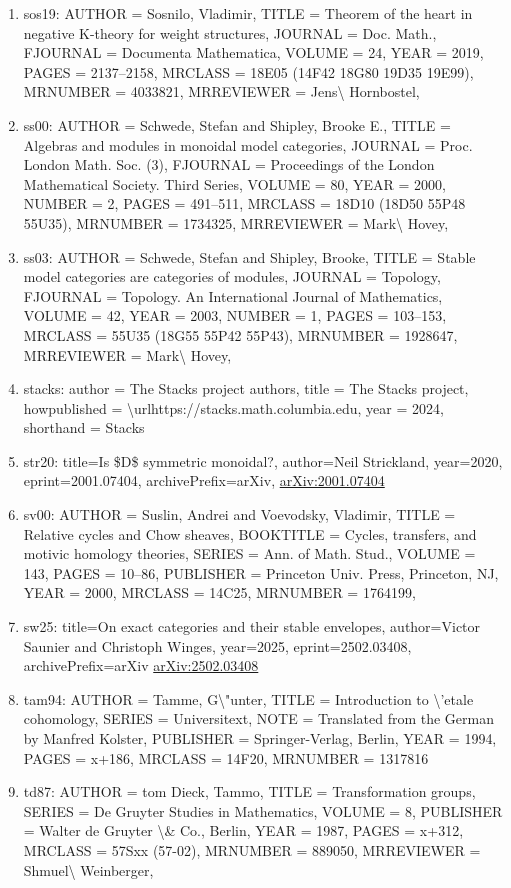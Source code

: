 \documentclass[11pt]{article}
\begin{document}
\begin{enumerate}[leftmargin=*]
  \item sos19: AUTHOR = Sosnilo, Vladimir, TITLE = Theorem of the heart in negative K-theory for weight structures, JOURNAL = Doc. Math., FJOURNAL = Documenta Mathematica, VOLUME = 24, YEAR = 2019, PAGES = 2137--2158, MRCLASS = 18E05 (14F42 18G80 19D35 19E99), MRNUMBER = 4033821, MRREVIEWER = Jens\textbackslash{} Hornbostel,
  \item ss00: AUTHOR = Schwede, Stefan and Shipley, Brooke E., TITLE = Algebras and modules in monoidal model categories, JOURNAL = Proc. London Math. Soc. (3), FJOURNAL = Proceedings of the London Mathematical Society. Third Series, VOLUME = 80, YEAR = 2000, NUMBER = 2, PAGES = 491--511, MRCLASS = 18D10 (18D50 55P48 55U35), MRNUMBER = 1734325, MRREVIEWER = Mark\textbackslash{} Hovey,
  \item ss03: AUTHOR = Schwede, Stefan and Shipley, Brooke, TITLE = Stable model categories are categories of modules, JOURNAL = Topology, FJOURNAL = Topology. An International Journal of Mathematics, VOLUME = 42, YEAR = 2003, NUMBER = 1, PAGES = 103--153, MRCLASS = 55U35 (18G55 55P42 55P43), MRNUMBER = 1928647, MRREVIEWER = Mark\textbackslash{} Hovey,
  \item stacks: author = The Stacks project authors, title = The Stacks project, howpublished = \textbackslash{}urlhttps://stacks.math.columbia.edu, year = 2024, shorthand = Stacks
  \item str20: title=Is \$D\$ symmetric monoidal?, author=Neil Strickland, year=2020, eprint=2001.07404, archivePrefix=arXiv, \href{https://arxiv.org/abs/2001.07404}{arXiv:2001.07404}
  \item sv00: AUTHOR = Suslin, Andrei and Voevodsky, Vladimir, TITLE = Relative cycles and Chow sheaves, BOOKTITLE = Cycles, transfers, and motivic homology theories, SERIES = Ann. of Math. Stud., VOLUME = 143, PAGES = 10--86, PUBLISHER = Princeton Univ. Press, Princeton, NJ, YEAR = 2000, MRCLASS = 14C25, MRNUMBER = 1764199,
  \item sw25: title=On exact categories and their stable envelopes, author=Victor Saunier and Christoph Winges, year=2025, eprint=2502.03408, archivePrefix=arXiv \href{https://arxiv.org/abs/2502.03408}{arXiv:2502.03408}
  \item tam94: AUTHOR = Tamme, G\textbackslash{}"unter, TITLE = Introduction to \textbackslash{}'etale cohomology, SERIES = Universitext, NOTE = Translated from the German by Manfred Kolster, PUBLISHER = Springer-Verlag, Berlin, YEAR = 1994, PAGES = x+186, MRCLASS = 14F20, MRNUMBER = 1317816
  \item td87: AUTHOR = tom Dieck, Tammo, TITLE = Transformation groups, SERIES = De Gruyter Studies in Mathematics, VOLUME = 8, PUBLISHER = Walter de Gruyter \textbackslash{}\& Co., Berlin, YEAR = 1987, PAGES = x+312, MRCLASS = 57Sxx (57-02), MRNUMBER = 889050, MRREVIEWER = Shmuel\textbackslash{} Weinberger,

\end{enumerate}
\end{document}
